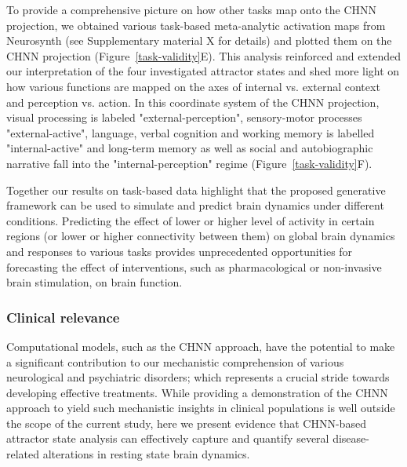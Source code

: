 \documentclass{article}
\begin{document}
To provide a comprehensive picture on how other tasks map onto the CHNN projection, we obtained various task-based
meta-analytic activation maps from Neurosynth (see Supplementary material X for details) and plotted them on the
CHNN projection (Figure~\ref{task-validity}E). This analysis reinforced and extended our interpretation of the four investigated attractor states and shed more light on how various functions are mapped on the axes of internal vs. external context and perception vs. action.
In this coordinate system of the CHNN projection, visual processing is labeled "external-perception", sensory-motor processes
"external-active", language, verbal cognition and working memory is labelled "internal-active" and long-term memory
as well as social and autobiographic narrative fall into the "internal-perception" regime (Figure~\ref{task-validity}F).

Together our results on task-based data highlight that the proposed generative framework can be used to simulate and predict brain dynamics under different conditions. Predicting the effect of lower or higher level of activity in certain regions (or lower or higher connectivity between them) on global brain dynamics and responses to various tasks provides unprecedented opportunities for forecasting the effect of interventions, such as pharmacological or non-invasive brain stimulation, on brain function.

\subsubsection{Clinical relevance}\label{Clinical relevance}

Computational models, such as the CHNN approach, have the potential to make a significant contribution to our mechanistic comprehension of various neurological and psychiatric disorders; which represents a crucial stride towards developing effective treatments. While providing a demonstration of the CHNN approach to yield such mechanistic insights in clinical populations is well outside the scope of the current study, here we present evidence that CHNN-based attractor state analysis can effectively capture and quantify several disease-related alterations in resting state brain dynamics.
\end{document}
